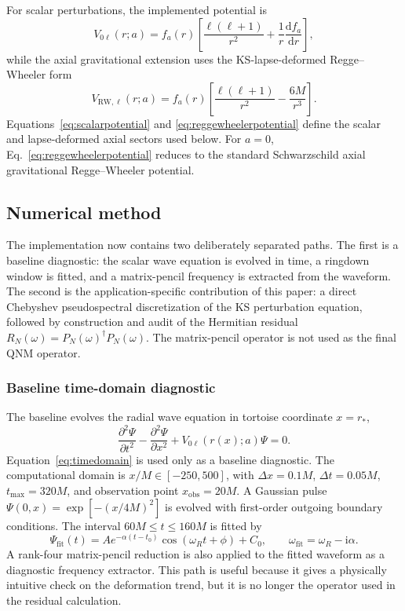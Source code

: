 ﻿\documentclass[12pt,a4paper]{article}
\newcommand{\dd}{\mathrm{d}}
\newcommand{\ii}{\mathrm{i}}
\begin{document}
For scalar perturbations, the implemented potential is
\begin{equation}
V_{0\ell}(r;a)=f_a(r)\left[\frac{\ell(\ell+1)}{r^2}+\frac{1}{r}\frac{\dd f_a}{\dd r}\right],
\label{eq:scalarpotential}
\end{equation}
while the axial gravitational extension uses the KS-lapse-deformed Regge--Wheeler form
\begin{equation}
V_{\mathrm{RW},\ell}(r;a)=f_a(r)\left[\frac{\ell(\ell+1)}{r^2}-\frac{6M}{r^3}\right].
\label{eq:reggewheelerpotential}
\end{equation}
Equations~\eqref{eq:scalarpotential} and \eqref{eq:reggewheelerpotential} define the scalar and lapse-deformed axial sectors used below. For \(a=0\), Eq.~\eqref{eq:reggewheelerpotential} reduces to the standard Schwarzschild axial gravitational Regge--Wheeler potential.

\subsection{Numerical method}

The implementation now contains two deliberately separated paths. The first is a baseline diagnostic: the scalar wave equation is evolved in time, a ringdown window is fitted, and a matrix-pencil frequency is extracted from the waveform. The second is the application-specific contribution of this paper: a direct Chebyshev pseudospectral discretization of the KS perturbation equation, followed by construction and audit of the Hermitian residual \(R_N(\omega)=P_N(\omega)^\dagger P_N(\omega)\). The matrix-pencil operator is not used as the final QNM operator.

\subsubsection{Baseline time-domain diagnostic}

The baseline evolves the radial wave equation in tortoise coordinate \(x=r_*\),
\begin{equation}
\frac{\partial^2\Psi}{\partial t^2}
-
\frac{\partial^2\Psi}{\partial x^2}
+
V_{0\ell}(r(x);a)\Psi=0.
\label{eq:timedomain}
\end{equation}
Equation~\eqref{eq:timedomain} is used only as a baseline diagnostic. The computational domain is \(x/M\in[-250,500]\), with \(\Delta x=0.1M\), \(\Delta t=0.05M\), \(t_{\max}=320M\), and observation point \(x_{\mathrm{obs}}=20M\). A Gaussian pulse \(\Psi(0,x)=\exp[-(x/4M)^2]\) is evolved with first-order outgoing boundary conditions. The interval \(60M\leq t\leq160M\) is fitted by
\begin{equation*}
\Psi_{\mathrm{fit}}(t)=A e^{-\alpha(t-t_0)}
\cos(\omega_R t+\phi)+C_0,
\qquad
\omega_{\mathrm{fit}}=\omega_R-\ii\alpha.
\end{equation*}
A rank-four matrix-pencil reduction is also applied to the fitted waveform as a diagnostic frequency extractor. This path is useful because it gives a physically intuitive check on the deformation trend, but it is no longer the operator used in the residual calculation.
\end{document}
